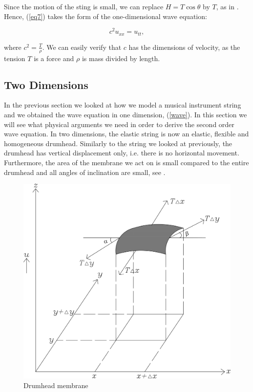 \documentclass[a4paper, 12pt]{article}
\numberwithin{equation}{section}
\begin{document}
Since the motion of the sting is small, we can replace $H=T\cos{\theta}$ by $T$, as in \cite{BoyDiP}. Hence, (\ref{eq7}) takes the 
form of the one-dimensional wave equation:

\begin{equation} \label{wave}
    c^2u_{xx}=u_{tt}, 
\end{equation}

where $c^2=\frac{T}{\rho}$. We can easily verify that $c$ has the dimensions of 
velocity, as the tension $T$ is a force and $\rho$ is mass divided by length.

\subsection{Two Dimensions} \label{twodim}
In the previous section we looked at how we model a musical instrument string and we obtained the wave equation in 
one dimension, (\ref{wave}). In this section we will see what physical arguments we need in order to derive the second order wave equation.
In two dimensions, the elastic string is now an elastic, flexible and homogeneous drumhead. Similarly to the string we looked at previously, 
the drumhead has vertical displacement only, i.e. there is no horizontal movement. Furthermore, the area of the membrane we act on is small
compared to the entire drumhead and all angles of inclination are small, see \cite{Kr}.

\begin{figure}[h]
    \centering
    \includegraphics[scale=0.5]{images/grafic-5} 
    \caption{Drumhead membrane}
    \label{fig:2}
\end{figure}
\end{document}
